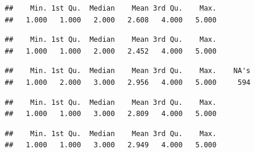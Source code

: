 \documentclass[
]{article}
\newenvironment{Shaded}{\begin{snugshade}}{\end{snugshade}}
\newcommand{\FunctionTok}[1]{\textcolor[rgb]{0.13,0.29,0.53}{\textbf{#1}}}
\newcommand{\NormalTok}[1]{#1}
\newcommand{\SpecialCharTok}[1]{\textcolor[rgb]{0.81,0.36,0.00}{\textbf{#1}}}
\begin{document}
\begin{verbatim}
##    Min. 1st Qu.  Median    Mean 3rd Qu.    Max. 
##   1.000   1.000   2.000   2.608   4.000   5.000
\end{verbatim}

\begin{Shaded}
\end{Shaded}

\begin{verbatim}
##    Min. 1st Qu.  Median    Mean 3rd Qu.    Max. 
##   1.000   1.000   2.000   2.452   4.000   5.000
\end{verbatim}

\begin{Shaded}
\end{Shaded}

\begin{verbatim}
##    Min. 1st Qu.  Median    Mean 3rd Qu.    Max.    NA's 
##   1.000   2.000   3.000   2.956   4.000   5.000     594
\end{verbatim}

\begin{Shaded}
\end{Shaded}

\begin{verbatim}
##    Min. 1st Qu.  Median    Mean 3rd Qu.    Max. 
##   1.000   1.000   3.000   2.809   4.000   5.000
\end{verbatim}

\begin{Shaded}
\end{Shaded}

\begin{verbatim}
##    Min. 1st Qu.  Median    Mean 3rd Qu.    Max. 
##   1.000   1.000   3.000   2.949   4.000   5.000
\end{verbatim}
\end{document}
